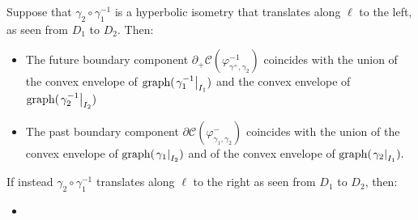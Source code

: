 \begin{proposition}\label{gettinthere}
    Suppose that $\gamma_2\circ\gamma_1^{-1}$ is a hyperbolic isometry that translates along $\ell$ to the left, as seen from $D_1$ to $D_2$. Then:
    \begin{itemize}
        \item The future boundary component $\partial_+\mathcal{C}(\varphi_{\gamma^+,\gamma_2}^{-1})$ coincides with the union of the convex envelope of $\text{graph}(\left.\gamma_1^{-1}\right|_{I_1})$ and the convex envelope of $\text{graph}(\left.\gamma_2^{-1}\right|_{I_2})$
        \item The past boundary component $\partial\mathcal{C}(\varphi^-_{\gamma_1,\gamma_2})$ coincides with the union of the convex envelope of $\text{graph}(\left.\gamma_1\right|_{I_2})$ and of the convex envelope of $\text{graph}(\left.\gamma_2\right|_{I_1}).$
    \end{itemize}
    If instead $\gamma_2\circ\gamma_1^{-1}$ translates along $\ell$ to the right as seen from $D_1$ to $D_2$, then:
    \begin{itemize}
        \item 
    \end{itemize}

\end{proposition}
